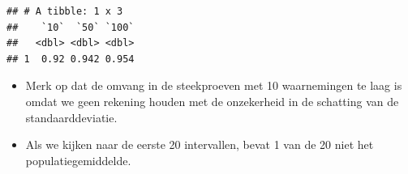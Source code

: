 \documentclass[
  12pt,dutch]{book}
\newenvironment{Shaded}{\begin{snugshade}}{\end{snugshade}}
\newcommand{\AttributeTok}[1]{\textcolor[rgb]{0.13,0.29,0.53}{#1}}
\newcommand{\FloatTok}[1]{\textcolor[rgb]{0.00,0.00,0.81}{#1}}
\newcommand{\FunctionTok}[1]{\textcolor[rgb]{0.13,0.29,0.53}{\textbf{#1}}}
\newcommand{\NormalTok}[1]{#1}
\newcommand{\OtherTok}[1]{\textcolor[rgb]{0.56,0.35,0.01}{#1}}
\newcommand{\SpecialCharTok}[1]{\textcolor[rgb]{0.81,0.36,0.00}{\textbf{#1}}}
\theoremstyle{definition}
\theoremstyle{definition}
\theoremstyle{definition}
\theoremstyle{definition}
\theoremstyle{remark}
\begin{document}
\begin{Shaded}
\end{Shaded}

\begin{verbatim}
## # A tibble: 1 x 3
##    `10`  `50` `100`
##   <dbl> <dbl> <dbl>
## 1  0.92 0.942 0.954
\end{verbatim}

\begin{itemize}
\item
  Merk op dat de omvang in de steekproeven met 10 waarnemingen te laag is omdat we geen rekening houden met de onzekerheid in de schatting van de standaarddeviatie.
\item
  Als we kijken naar de eerste 20 intervallen, bevat 1 van de 20 niet het populatiegemiddelde.
\end{itemize}
\end{document}
